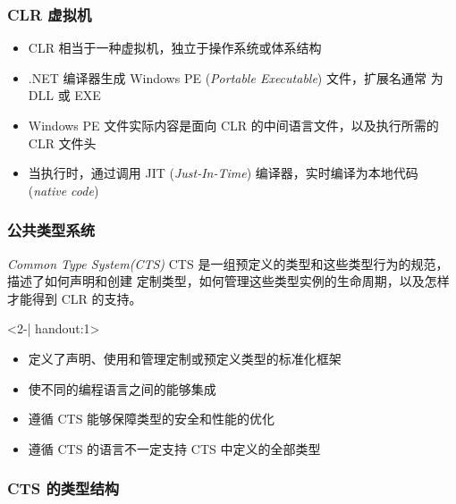 \begin{frame}
\frametitle{CLR 虚拟机}
\begin{itemize}
\item<1-| handout:1> CLR 相当于一种虚拟机，独立于操作系统或体系结构
\item<2-| handout:1> .NET 编译器生成 Windows PE (\textit{Portable Executable}) 文件，扩展名通常
  为 DLL 或 EXE
\item<3-| handout:1> Windows PE 文件实际内容是面向 CLR 的中间语言文件，以及执行所需的 CLR 文件头
\item<4-| handout:1> 当执行时，通过调用 JIT (\textit{Just-In-Time}) 编译器，实时编译为本地代码
  (\textit{native code})
\end{itemize}

\begin{figure}[h] 
  \centering 
\end{figure}
\end{frame}


\begin{frame}
\frametitle{公共类型系统}

\begin{block}{\textit{Common Type System(CTS)}}
  \CJKindent CTS 是一组预定义的类型和这些类型行为的规范，描述了如何声明和创建
  定制类型，如何管理这些类型实例的生命周期，以及怎样才能得到 CLR 的支持。
\end{block}

\begin{uncoverenv}<2-| handout:1>
  \begin{itemize}
  \item 定义了声明、使用和管理定制或预定义类型的标准化框架
  \item 使不同的编程语言之间的能够集成
  \item 遵循 CTS 能够保障类型的安全和性能的优化
  \item 遵循 CTS 的语言不一定支持 CTS 中定义的全部类型
  \end{itemize}
\end{uncoverenv}
\end{frame}

\begin{frame}[c]
\frametitle{CTS 的类型结构}

\begin{figure}[h]  
  \centering  
\end{figure}
\end{frame}


